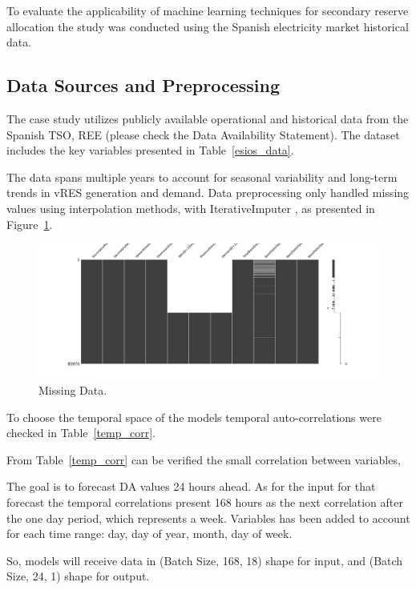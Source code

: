 To evaluate the applicability of machine learning techniques for secondary reserve allocation the study was conducted using the Spanish electricity market historical data.

\subsection{Data Sources and Preprocessing}

The case study utilizes publicly available operational and historical data from the Spanish \gls{TSO}, \gls{REE} (please check the Data Availability Statement). The dataset includes the key variables presented in Table~\ref{esios_data}.



The data spans multiple years to account for seasonal variability and long-term trends in vRES generation and demand. Data preprocessing only handled missing values using interpolation methods, with IterativeImputer \cite{vanBuuren2011,Buck1960}, as presented in Figure~\ref{fig:misisng_data}.

\begin{figure}[H]
    \centering
    \includegraphics[width=\textwidth]{plots/missing_data.png}
    \caption{Missing Data.}
    \label{fig:misisng_data}
  \end{figure}
	

To choose the temporal space of the models temporal auto-correlations were checked in Table~\ref{temp_corr}.



From Table~\ref{temp_corr} can be verified the small correlation between variables,  

The goal is to forecast \gls{DA} values 24 hours ahead. As for the input for that forecast the temporal correlations present 168 hours as the next correlation after the one day period, which represents a week.
Variables has been added to account for each time range: day, day of year, month, day of week.\par
So, models will receive data in (Batch Size, 168, 18) shape for input, and (Batch Size, 24, 1) shape for output.




